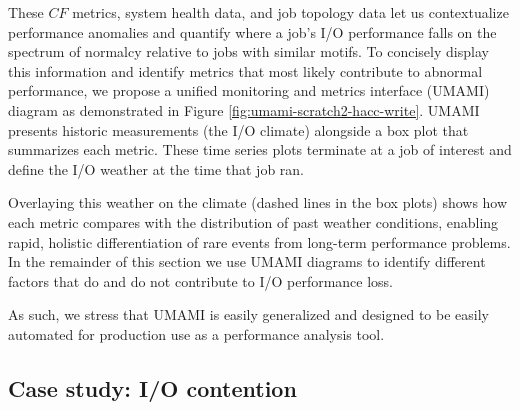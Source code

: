 These $\mathit{CF}$ metrics, system health data, and job topology data let us contextualize performance anomalies and quantify where a job's I/O performance falls on the spectrum of normalcy relative to jobs with similar motifs.
To concisely display this information and identify metrics that most likely contribute to abnormal performance, we propose a unified monitoring and metrics interface (UMAMI) diagram as demonstrated in Figure \ref{fig:umami-scratch2-hacc-write}.
UMAMI presents historic measurements (the I/O climate) alongside a box plot that summarizes each metric.
These time series plots terminate at a job of interest and define the I/O weather at the time that job ran.

Overlaying this weather on the climate (dashed lines in the box plots) shows how each metric compares with the distribution of past weather conditions, enabling rapid, holistic differentiation of rare events from long-term performance problems.
In the remainder of this section we use UMAMI diagrams to identify different factors that do and do not contribute to I/O performance loss.

As such, we stress that UMAMI is easily generalized and designed to be easily automated for production use as a performance analysis tool.

\subsection{Case study: I/O contention}

